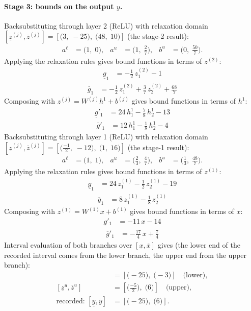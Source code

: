 \documentclass[11pt]{article}
\begin{document}
\paragraph{Stage 3: bounds on the output $y$.}
Backsubstituting through layer 2 (ReLU) with relaxation domain $[\underline{z}^{(j)}, \overline{z}^{(j)}] = [\bigl(3,\; -25\bigr),\; \bigl(48,\; 10\bigr)]$ (the stage-2 result):
\begin{align*}
a^{\ell} &= \bigl(1,\; 0\bigr), & a^{u} &= \bigl(1,\; \frac{2}{7}\bigr), & b^{u} &= \bigl(0,\; \frac{50}{7}\bigr).
\end{align*}
Applying the relaxation rules gives bound functions in terms of $z^{(2)}$:
\begin{align*}
\underline{g}_{1} &= -\frac{1}{2}\,z^{(2)}_{1} - 1
\end{align*}
\begin{align*}
\overline{g}_{1} &= -\frac{1}{2}\,z^{(2)}_{1} + \frac{3}{7}\,z^{(2)}_{2} + \frac{68}{7}
\end{align*}
Composing with $z^{(j)} = W^{(j)} h^{1} + b^{(j)}$ gives bound functions in terms of $h^{1}$:
\begin{align*}
\underline{g}'_{1} &= 24\,h^{1}_{1} - \frac{7}{8}\,h^{1}_{2} - 13
\end{align*}
\begin{align*}
\overline{g}'_{1} &= 12\,h^{1}_{1} - \frac{1}{8}\,h^{1}_{2} - 4
\end{align*}
Backsubstituting through layer 1 (ReLU) with relaxation domain $[\underline{z}^{(j)}, \overline{z}^{(j)}] = [\bigl(\frac{-1}{2},\; -12\bigr),\; \bigl(1,\; 16\bigr)]$ (the stage-1 result):
\begin{align*}
a^{\ell} &= \bigl(1,\; 1\bigr), & a^{u} &= \bigl(\frac{2}{3},\; \frac{4}{7}\bigr), & b^{u} &= \bigl(\frac{1}{3},\; \frac{48}{7}\bigr).
\end{align*}
Applying the relaxation rules gives bound functions in terms of $z^{(1)}$:
\begin{align*}
\underline{g}_{1} &= 24\,z^{(1)}_{1} - \frac{1}{2}\,z^{(1)}_{2} - 19
\end{align*}
\begin{align*}
\overline{g}_{1} &= 8\,z^{(1)}_{1} - \frac{1}{8}\,z^{(1)}_{2}
\end{align*}
Composing with $z^{(1)} = W^{(1)} x + b^{(1)}$ gives bound functions in terms of $x$:
\begin{align*}
\underline{g}'_{1} &= -11\,x - 14
\end{align*}
\begin{align*}
\overline{g}'_{1} &= -\frac{17}{4}\,x + \frac{7}{4}
\end{align*}
Interval evaluation of both branches over $[\underline{x}, \overline{x}]$ gives (the lower end of the recorded interval comes from the lower branch, the upper end from the upper branch):
\begin{align*}
[\underline{z}^{\ell}, \overline{z}^{\ell}] &= [\bigl(-25\bigr),\; \bigl(-3\bigr)] \quad\text{(lower)}, \\
[\underline{z}^{u}, \overline{z}^{u}] &= [\bigl(\frac{-5}{2}\bigr),\; \bigl(6\bigr)] \quad\text{(upper)}, \\
\text{recorded: } [\underline{y}, \overline{y}] &= [\bigl(-25\bigr),\; \bigl(6\bigr)].
\end{align*}
\end{document}
